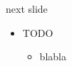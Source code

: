 
\begin{Slide}{next slide}

\begin{itemize}
\item TODO
\begin{itemize}
\item blabla
\end{itemize}
\end{itemize}
\end{Slide}